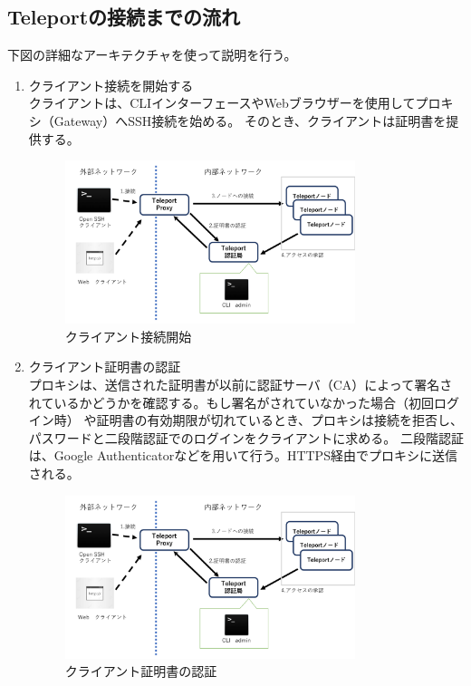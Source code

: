 \documentclass[11pt,a4j,titlepage]{jreport}
\begin{document}
\subsection*{Teleportの接続までの流れ}
下図の詳細なアーキテクチャを使って説明を行う。

\begin{enumerate}[1:]

    \item クライアント接続を開始する\mbox{}\\クライアントは、CLIインターフェースやWebブラウザーを使用してプロキシ（Gateway）へSSH接続を始める。
    そのとき、クライアントは証明書を提供する。\\
    \begin{figure}[H]
        \centering
        \includegraphics*[width=0.8\textwidth,page=2]{graphs/teleport_archtecture.pdf}
        \caption{クライアント接続開始}
        \label{teleport_connect}
    \end{figure}


    \item クライアント証明書の認証\mbox{}\\
    プロキシは、送信された証明書が以前に認証サーバ（CA）によって署名されているかどうかを確認する。もし署名がされていなかった場合（初回ログイン時）
    や証明書の有効期限が切れているとき、プロキシは接続を拒否し、パスワードと二段階認証でのログインをクライアントに求める。
    二段階認証は、Google Authenticatorなどを用いて行う。HTTPS経由でプロキシに送信される。
    \begin{figure}[H]
        \centering
        \includegraphics*[width=0.8\textwidth,page=3]{graphs/teleport_archtecture.pdf}
        \caption{クライアント証明書の認証}
        \label{teleport_certificate}
    \end{figure}


\end{enumerate}
\end{document}
